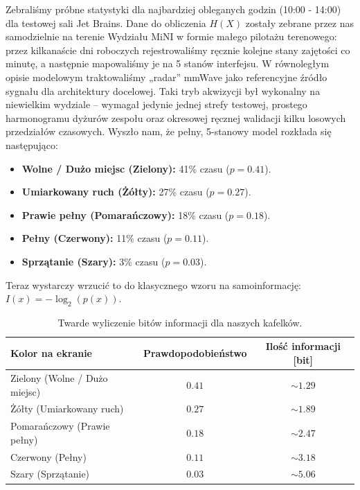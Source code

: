 \documentclass[14pt,a4paper]{extarticle}
\begin{document}
Zebraliśmy próbne statystyki dla najbardziej obleganych godzin (10:00 - 14:00) dla testowej sali Jet Brains. Dane do obliczenia $H(X)$ zostały zebrane przez nas samodzielnie na terenie Wydziału MiNI w formie małego pilotażu terenowego: przez kilkanaście dni roboczych rejestrowaliśmy ręcznie kolejne stany zajętości co minutę, a następnie mapowaliśmy je na 5 stanów interfejsu. W równoległym opisie modelowym traktowaliśmy „radar” mmWave jako referencyjne źródło sygnału dla architektury docelowej. Taki tryb akwizycji był wykonalny na niewielkim wydziale -- wymagał jedynie jednej strefy testowej, prostego harmonogramu dyżurów zespołu oraz okresowej ręcznej walidacji kilku losowych przedziałów czasowych. Wyszło nam, że pełny, 5-stanowy model rozkłada się następująco:
\begin{itemize}
    \item \textbf{Wolne / Dużo miejsc (Zielony):} 41\% czasu ($p = 0.41$).
    \item \textbf{Umiarkowany ruch (Żółty):} 27\% czasu ($p = 0.27$).
    \item \textbf{Prawie pełny (Pomarańczowy):} 18\% czasu ($p = 0.18$).
    \item \textbf{Pełny (Czerwony):} 11\% czasu ($p = 0.11$).
    \item \textbf{Sprzątanie (Szary):} 3\% czasu ($p = 0.03$).
\end{itemize}

Teraz wystarczy wrzucić to do klasycznego wzoru na samoinformację: $I(x) = -\log_2(p(x))$.
\begin{table}[H]
    \centering
    \renewcommand{\arraystretch}{1.3}
    \begin{tabular}{|l|c|c|}
        \hline
        \textbf{Kolor na ekranie} & \textbf{Prawdopodobieństwo} & \textbf{Ilość informacji [bit]} \\
        \hline
        Zielony (Wolne / Dużo miejsc) & $0.41$ & $\sim 1.29$ \\
        \hline
        Żółty (Umiarkowany ruch) & $0.27$ & $\sim 1.89$ \\
        \hline
        Pomarańczowy (Prawie pełny) & $0.18$ & $\sim 2.47$ \\
        \hline
        Czerwony (Pełny) & $0.11$ & $\sim 3.18$ \\
        \hline
        Szary (Sprzątanie) & $0.03$ & $\sim 5.06$ \\
        \hline
    \end{tabular}
    \caption{Twarde wyliczenie bitów informacji dla naszych kafelków.}
    \label{tab:entropia}
\end{table}
\end{document}
